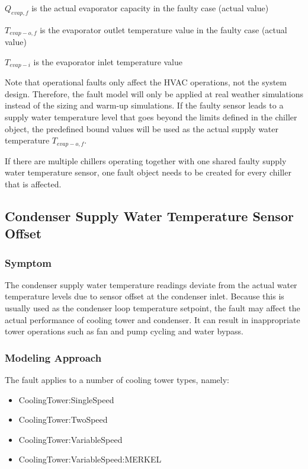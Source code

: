 \(Q_{evap,f}\) is the actual evaporator capacity in the faulty case (actual value)

\(T_{evap-o,f}\) is the evaporator outlet temperature value in the faulty case (actual value)

\(T_{evap-i}\) is the evaporator inlet temperature value 

Note that operational faults only affect the HVAC operations, not the system design. Therefore, the fault model will only be applied at real weather simulations instead of the sizing and warm-up simulations. If the faulty sensor leads to a supply water temperature level that goes beyond the limits defined in the chiller object, the predefined bound values will be used as the actual supply water temperature \(T_{evap-o,f}\).

If there are multiple chillers operating together with one shared faulty supply water temperature sensor, one fault object needs to be created for every chiller that is affected.


\subsection{Condenser Supply Water Temperature Sensor Offset}\label{condenser-supply-water-temperature-sensor-offset}

\subsubsection{Symptom}

The condenser supply water temperature readings deviate from the actual water temperature levels due to sensor offset at the condenser inlet. Because this is usually used as the condenser loop temperature setpoint, the fault may affect the actual performance of cooling tower and condenser. It can result in inappropriate tower operations such as fan and pump cycling and water bypass. 

\subsubsection{Modeling Approach}

The fault applies to a number of cooling tower types, namely:

\begin{itemize}
\tightlist
\item
  CoolingTower:SingleSpeed
\item
  CoolingTower:TwoSpeed
\item
  CoolingTower:VariableSpeed
\item
  CoolingTower:VariableSpeed:MERKEL
\end{itemize}

